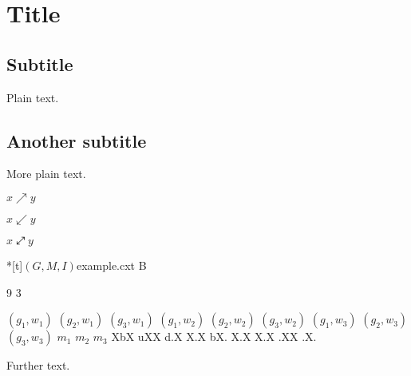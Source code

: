 \documentclass{article}
\begin{document}
\section{Title}

\subsection{Subtitle}

Plain text.

\subsection{Another subtitle}

More plain text.

$x\nearrow y$

$x\swarrow y$

$x\neswarrow y$

\begin{newcxt}*[t]{$(G,M,I)$}{example.cxt}
B

9
3

$(g_1,w_1)$
$(g_2,w_1)$
$(g_3,w_1)$
$(g_1,w_2)$
$(g_2,w_2)$
$(g_3,w_2)$
$(g_1,w_3)$
$(g_2,w_3)$
$(g_3,w_3)$
$m_1$
$m_2$
$m_3$
XbX
uXX
d.X
X.X
bX.
X.X
X.X
.XX
.X.
\end{newcxt}

\begin{center}
\end{center}

Further text.
\end{document}

